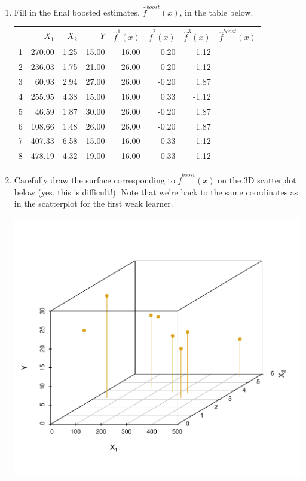 \documentclass{article}\usepackage[]{graphicx}\usepackage[]{color}
\begin{document}
\begin{enumerate}
\item Fill in the final boosted estimates, $\hat{f}^{boost}(x)$, in the table below.

\vspace{10mm}

\begin{tabular}{rrrrrrrl}
  \hline
 & $X_1$ & $X_2$ & $Y$ & $\hat{f}^1(x)$ & $\hat{f}^2(x)$ & $\hat{f}^3(x)$ & $\hat{f}^{boost}(x)$ \\ 
  \hline
1 & 270.00 & 1.25 & 15.00 & 16.00 & -0.20 & -1.12 &  \\ 
  2 & 236.03 & 1.75 & 21.00 & 26.00 & -0.20 & -1.12 &  \\ 
  3 & 60.93 & 2.94 & 27.00 & 26.00 & -0.20 & 1.87 &  \\ 
  4 & 255.95 & 4.38 & 15.00 & 16.00 & 0.33 & -1.12 &  \\ 
  5 & 46.59 & 1.87 & 30.00 & 26.00 & -0.20 & 1.87 &  \\ 
  6 & 108.66 & 1.48 & 26.00 & 26.00 & -0.20 & 1.87 &  \\ 
  7 & 407.33 & 6.58 & 15.00 & 16.00 & 0.33 & -1.12 &  \\ 
  8 & 478.19 & 4.32 & 19.00 & 16.00 & 0.33 & -1.12 &  \\ 
   \hline
\end{tabular}


\vspace{8mm}
\item Carefully draw the surface corresponding to $\hat{f}^{boost}(x)$ on the 3D scatterplot below (yes, this is difficult!). Note that we're back to the same coordinates as in the scatterplot for the first weak learner.

\vspace{-8mm}

\begin{center}
{\includegraphics[scale=0.9]{scatterD.pdf}}
\end{center}



\end{enumerate}
\end{document}
